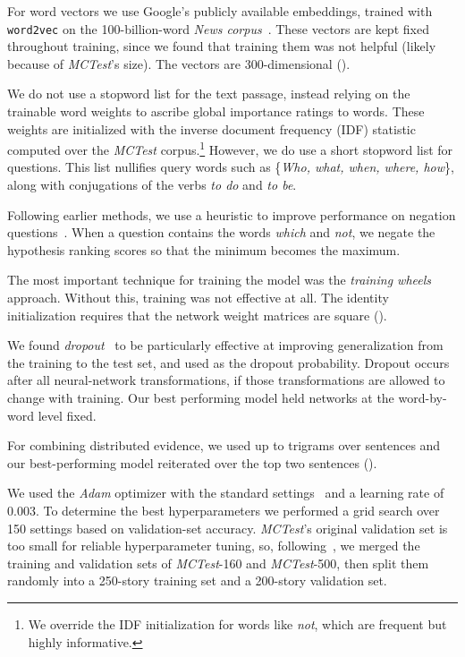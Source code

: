 \documentclass[11pt]{article}
\begin{document}
For word vectors we use Google's publicly available embeddings, trained with \texttt{word2vec} on the 100-billion-word {\it News corpus}~\cite{mikolov2013}. These vectors are kept fixed throughout training, since we found that training them was not helpful (likely because of {\it MCTest}'s size). The vectors are 300-dimensional ().

We do not use a stopword list for the text passage, instead relying on the trainable word weights to ascribe global importance ratings to words. These weights are initialized with the inverse document frequency (IDF) statistic computed over the {\it MCTest} corpus.\footnote{We override the IDF initialization for words like \textsl{not}, which are frequent but highly informative.} However, we do use a short stopword list for questions. This list nullifies query words such as \{\textsl{Who, what, when, where, how}\}, along with conjugations of the verbs \textsl{to do} and \textsl{to be}.

Following earlier methods, we use a heuristic to improve performance on negation questions~\cite{sachan2015,wang2015mc}. 
When a question contains the words \textsl{which} and \textsl{not}, we negate the hypothesis ranking scores so that the minimum becomes the maximum.

The most important technique for training the model was the {\it training wheels} approach. Without this, training was not effective at all. The identity initialization requires that the network weight matrices are square ().

We found {\it dropout}~\cite{srivastava2014} to be particularly effective at improving generalization from the training to the test set, and used  as the dropout probability. Dropout occurs after all neural-network transformations, if those transformations are allowed to change with training. Our best performing model held networks at the word-by-word level fixed.

For combining distributed evidence, we used up to trigrams over sentences and our best-performing model reiterated over the top two sentences ().

We used the {\it Adam} optimizer with the standard settings~\cite{kingma2014} and a learning rate of 0.003. To determine the best hyperparameters we performed a grid search over 150 settings based on validation-set accuracy. {\it MCTest}'s original validation set is too small for reliable hyperparameter tuning, so, following~, we merged the training and validation sets of {\it MCTest}-160 and {\it MCTest}-500, then split them randomly into a 250-story training set and a 200-story validation set.
\end{document}
